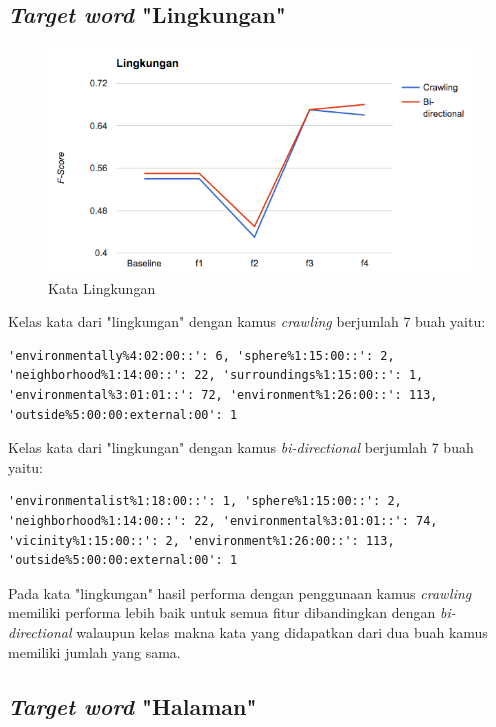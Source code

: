 \subsection{\textit{Target word} "Lingkungan"}

\begin{figure}
	\centering
	\includegraphics[width=1\linewidth]{adit_pics/lingkungan.png}
	\caption{Kata Lingkungan}
	\label{fig:halaman}
\end{figure}

Kelas kata dari "lingkungan" dengan kamus \textit{crawling} berjumlah 7 buah yaitu:
\begin{lstlisting}
'environmentally%4:02:00::': 6, 'sphere%1:15:00::': 2, 'neighborhood%1:14:00::': 22, 'surroundings%1:15:00::': 1, 'environmental%3:01:01::': 72, 'environment%1:26:00::': 113, 'outside%5:00:00:external:00': 1
\end{lstlisting}
Kelas kata dari "lingkungan" dengan kamus \textit{bi-directional} berjumlah 7 buah yaitu:
\begin{lstlisting}
'environmentalist%1:18:00::': 1, 'sphere%1:15:00::': 2, 'neighborhood%1:14:00::': 22, 'environmental%3:01:01::': 74, 'vicinity%1:15:00::': 2, 'environment%1:26:00::': 113, 'outside%5:00:00:external:00': 1
\end{lstlisting}


Pada kata "lingkungan" hasil performa dengan penggunaan kamus \textit{crawling} memiliki performa lebih baik untuk semua fitur dibandingkan dengan \textit{bi-directional} walaupun kelas makna kata yang didapatkan dari dua buah kamus memiliki jumlah yang sama.

\subsection{\textit{Target word} "Halaman"}

